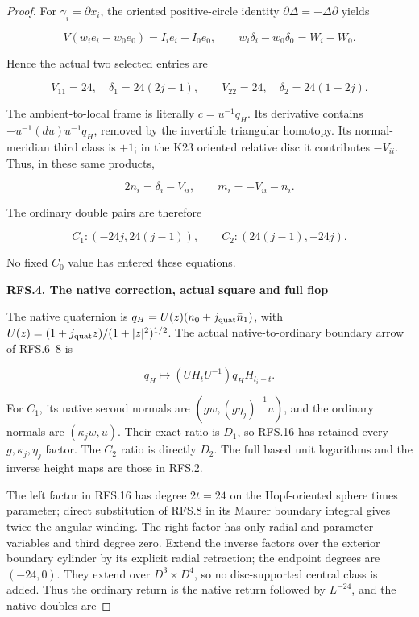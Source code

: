 \begin{proof}
For \(\gamma_i=\partial x_i\), the oriented positive-circle
identity \(\partial\Delta=-\Delta\partial\) yields

\[
 V(w_ie_i-w_0e_0)=I_ie_i-I_0e_0,\qquad
 w_i\delta_i-w_0\delta_0=W_i-W_0.
 \tag{RFS.12}
\]

Hence the actual two selected entries are

\[
 V_{11}=24,\quad\delta_1=24(2j-1),\qquad
 V_{22}=24,\quad\delta_2=24(1-2j).
 \tag{RFS.13}
\]

The ambient-to-local frame is literally \(c=u^{-1}q_H\).
Its derivative contains \(-u^{-1}(du)u^{-1}q_H\), removed by the
invertible triangular homotopy. Its normal-meridian third class
is \(+1\); in the K23 oriented relative disc it contributes
\(-V_{ii}\). Thus, in these same products,

\[
 2n_i=\delta_i-V_{ii},\qquad m_i=-V_{ii}-n_i.
 \tag{RFS.14}
\]

The ordinary double pairs are therefore

\[
 C_1:(-24j,24(j-1)),\qquad
 C_2:(24(j-1),-24j).
 \tag{RFS.15}
\]

No fixed \(C_0\) value has entered these equations.

\par

\medskip\noindent\textbf{RFS.4. The native correction, actual square and full flop}

\par\nobreak

The native quaternion is
\(q_H=U(z)(n_0+j_{\rm quat}\bar n_1)\), with
\(U(z)=(1+j_{\rm quat}z)/(1+|z|^2)^{1/2}\).
The actual native-to-ordinary boundary arrow of RFS.6--8 is

\[
 q_H\longmapsto(UH_tU^{-1})q_HH_{l_i-t}.
 \tag{RFS.16}
\]

For \(C_1\), its native second normals are
\((gw,(g\eta_j)^{-1}u)\), and the ordinary normals are
\((\kappa_jw,u)\). Their exact ratio is \(D_1\), so RFS.16
has retained every \(g,\kappa_j,\eta_j\) factor. The \(C_2\)
ratio is directly \(D_2\). The full based unit logarithms and
the inverse height maps are those in RFS.2.

The left factor in RFS.16 has degree \(2t=24\) on the
Hopf-oriented sphere times parameter; direct substitution of
RFS.8 in its Maurer boundary integral gives twice the angular
winding. The right factor has only radial and parameter variables
and third degree zero. Extend the inverse factors over the
exterior boundary cylinder by its explicit radial retraction;
the endpoint degrees are \((-24,0)\). They extend over
\(D^3\times D^4\), so no disc-supported central class is added.
Thus the ordinary return is the native return followed by
\(L^{-24}\), and the native doubles are


\end{proof}
